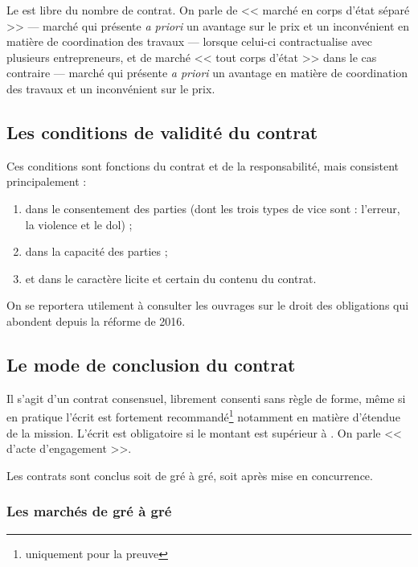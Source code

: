 		Le \Mo{} est libre du nombre de contrat. On parle de << marché en corps d'état séparé >> --- marché qui présente \emph{a priori} un avantage sur le prix et un inconvénient en matière de coordination des travaux --- lorsque celui-ci contractualise avec plusieurs entrepreneurs, et de marché << tout corps d'état >> dans le cas contraire --- marché qui présente \emph{a priori} un avantage en matière de coordination des travaux et un inconvénient sur le prix.

		\subsection{Les conditions de validité du contrat}

		Ces conditions sont fonctions du contrat et de la responsabilité, mais consistent principalement :
		\begin{enumerate}
			\item dans le consentement des parties (dont les trois types de vice sont : l'erreur, la violence et le dol) ;
			\item dans la capacité des parties ;
			\item et dans le caractère licite et certain du contenu du contrat.
		\end{enumerate}

		\begin{conseil}
			On se reportera utilement à consulter les ouvrages sur le droit des obligations qui abondent depuis la réforme de 2016.
		\end{conseil}

		\subsection{Le mode de conclusion du contrat}

			Il s'agit d'un contrat consensuel, librement consenti sans règle de forme, même si en pratique l'écrit est fortement recommandé\footnote{uniquement pour la preuve} notamment en matière d'étendue de la mission. L'écrit est obligatoire si le montant est supérieur à . On parle << d'acte d'engagement >>.

			Les contrats sont conclus soit de gré à gré, soit après mise en concurrence.

			\subsubsection{Les marchés de gré à gré}

